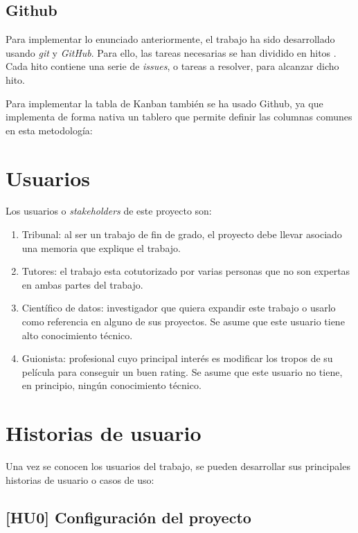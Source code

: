 \subsection{Github}

Para implementar lo enunciado anteriormente, el trabajo ha sido desarrollado usando \textit{git} y \textit{GitHub}.
Para ello, las tareas necesarias se han dividido en hitos \cite{milestones}. Cada hito contiene una
serie de \textit{issues}, o tareas a resolver, para alcanzar dicho hito.

Para implementar la tabla de Kanban también se ha usado Github, ya que implementa de forma nativa un
tablero que permite definir las columnas comunes en esta metodología:

\section{Usuarios}

Los usuarios o \textit{stakeholders} de este proyecto son:

\begin{enumerate}
      \item Tribunal: al ser un trabajo de fin de grado, el proyecto debe llevar asociado una memoria
            que explique el trabajo.
      \item Tutores: el trabajo esta cotutorizado por varias personas que no son expertas en ambas partes del trabajo.
      \item Científico de datos: investigador que quiera expandir este trabajo o usarlo como
            referencia en alguno de sus proyectos. Se asume que este usuario tiene alto conocimiento técnico.
      \item Guionista: profesional cuyo principal interés es modificar los tropos de su película para
            conseguir un buen rating. Se asume que este usuario no tiene, en principio, ningún conocimiento
            técnico.
\end{enumerate}

\section{Historias de usuario}

Una vez se conocen los usuarios del trabajo, se pueden desarrollar sus principales historias de usuario o casos de uso:

\subsection{[HU0] Configuración del proyecto} \label{uc:configuration}

